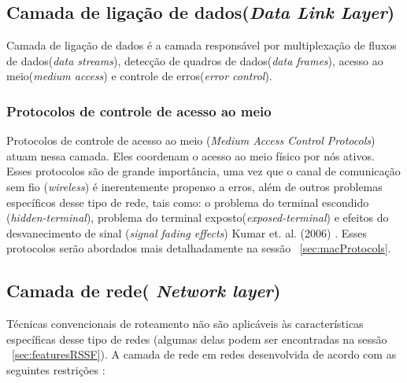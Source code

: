  \subsection{Camada de ligação de dados(\textit{Data Link Layer}) }
 
 Camada de ligação de dados é a camada responsável por multiplexação de fluxos de dados(\textit{data streams}), detecção de quadros de dados(\textit{data frames}), acesso ao meio(\textit{medium access}) e controle de erros(\textit{error control}).
 
 \subsubsection{Protocolos de controle de acesso ao meio}
 
 Protocolos de controle de acesso ao meio (\textit{Medium Access Control Protocols}) atuam nessa camada. Eles coordenam o acesso ao meio físico por nós ativos. Esses protocolos são de grande importância, uma vez que o canal de comunicação sem fio (\textit{wireless}) é inerentemente propenso a erros, além de outros problemas específicos desse tipo de rede, tais como: o problema do terminal escondido (\textit{hidden-terminal}), problema do terminal exposto(\textit{exposed-terminal}) e efeitos do desvanecimento de sinal (\textit{signal fading effects}) Kumar et. al. (2006) \cite{Kumar06mediumaccess}. Esses protocolos serão abordados mais detalhadamente na sessão ~\ref{sec:macProtocols}.

 
 \subsection{Camada de rede( \textit{Network layer})} 
 
 Técnicas convencionais de roteamento não são aplicáveis às características específicas desse tipo de redes (algumas delas podem ser encontradas na sessão ~\ref{sec:featuresRSSF}). A camada de rede em redes desenvolvida de acordo com as seguintes restrições \cite{Guerses2005}:
 
